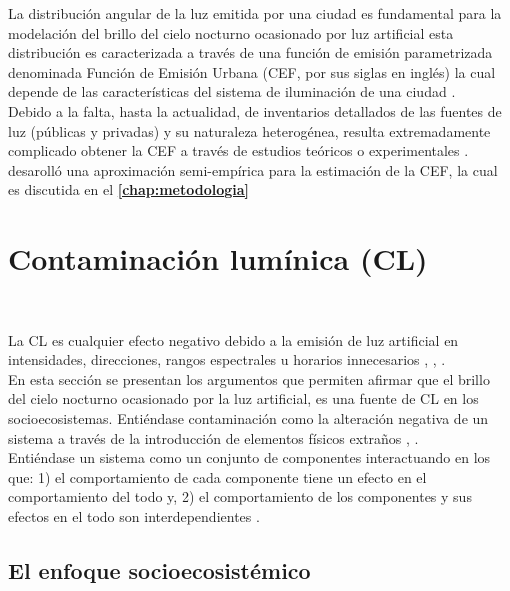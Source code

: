 La distribución angular de la luz emitida por una ciudad es fundamental para la modelación del brillo del cielo nocturno ocasionado por luz artificial \citep{Kocifaj2014} esta distribución es caracterizada a través de una función de emisión parametrizada denominada Función de Emisión Urbana (CEF, por sus siglas en inglés) la cual depende de las características del sistema de iluminación de una ciudad \citep{Kocifaj2014}.\\

Debido a la falta, hasta la actualidad, de inventarios detallados de las fuentes de luz (públicas y privadas) y su naturaleza heterogénea, resulta extremadamente complicado obtener la CEF a través de estudios teóricos o experimentales \citep{Kocifaj2014}. \cite{Garstang1986} desarolló una aproximación semi-empírica para la estimación de la CEF, la cual es discutida en el \textbf{\autoref{chap:metodologia}}

\newpage

\section{Contaminación lumínica (CL)}\\
\label{sec:contaminacionluminica}

La CL es cualquier efecto negativo debido a la emisión de luz artificial en intensidades, direcciones, rangos espectrales u horarios innecesarios \citep{AtlasREPSA}, \citep{LibroCL}, \citep{Stone2017}.\\

En esta sección se presentan los argumentos que permiten afirmar que el brillo del cielo nocturno ocasionado por la luz artificial, es una fuente de CL en los socioecosistemas. Entiéndase contaminación como la alteración negativa de un sistema a través de la introducción de elementos físicos extraños \citep{AtlasREPSA}, \citep{LibroCL}.\\

Entiéndase un sistema como un conjunto de componentes interactuando en los que: 1) el comportamiento de cada componente tiene un efecto en el comportamiento del todo y, 2) el comportamiento de los componentes y sus efectos en el todo son interdependientes \citep{Avila2019}.\\

\subsection{El enfoque socioecosistémico}

